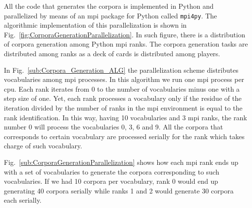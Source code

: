 {All the code that generates the corpora is implemented in Python and parallelized by means of an \gls{mpi} package for Python called \texttt{mpi4py}. The algorithmic implementation of this parallelization is shown in Fig.~\ref{fig:CorporaGenerationParallelization}. In such figure, there is a distribution of corpora generation among Python \gls{mpi} ranks. The corpora generation tasks are distributed among ranks as a deck of cards is distributed among players.

In Fig.~\ref{sub:Corpora_Generation_ALG} the parallelization scheme distributes vocabularies among \gls{mpi} processes. In this algorithm we run one \gls{mpi} process per \gls{cpu}. Each rank iterates from 0 to the number of vocabularies minus one with a step size of one. Yet, each rank processes a vocabulary only if the residue of the iteration divided by the number of ranks in the \gls{mpi} environment is equal to the rank identification. In this way, having 10 vocabularies and 3 \gls{mpi} ranks, the rank number 0 will process the vocabularies 0, 3, 6 and 9. All the corpora that corresponds to certain vocabulary are processed serially for the rank which takes charge of such vocabulary.

Fig.~\ref{sub:CorporaGenerationParallelization} shows how each \gls{mpi} rank ends up with a set of vocabularies to generate the corpora corresponding to such vocabularies. If we had 10 corpora per vocabulary, rank 0 would end up generating 40 corpora serially while ranks 1 and 2 would generate 30 corpora each serially.

}
